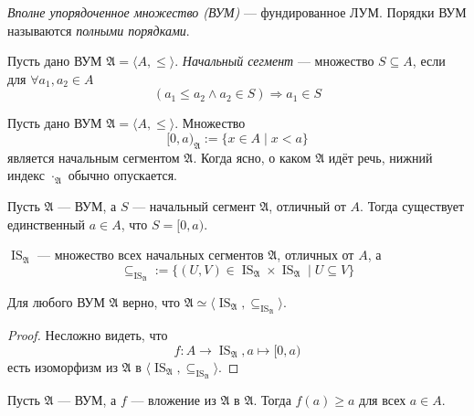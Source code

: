 \documentclass[12pt,a4paper]{article}
\DeclareMathOperator{\IS}{IS}
\begin{document}
    \begin{definition}
        \emph{Вполне упорядоченное множество (ВУМ)} --- фундированное ЛУМ. Порядки ВУМ называются \emph{полными порядками}.
    \end{definition}

    \begin{definition}
        Пусть дано ВУМ $\mathfrak{A} = \langle A, {\leqslant} \rangle$. \emph{Начальный сегмент} --- множество $S \subseteq A$, если для $\forall a_1, a_2 \in A$
        \[(a_1 \leqslant a_2 \wedge a_2 \in S) \Rightarrow a_1 \in S\]
    \end{definition}

    \begin{definition}
        Пусть дано ВУМ $\mathfrak{A} = \langle A, {\leqslant} \rangle$. Множество
        \[[0, a)_{\mathfrak{A}} := \{x \in A \mid x < a\}\]
        является начальным сегментом $\mathfrak{A}$. Когда ясно, о каком $\mathfrak{A}$ идёт речь, нижний индекс $\cdot_{\mathfrak{A}}$ обычно опускается.
    \end{definition}

    \begin{statement}
        Пусть $\mathfrak{A}$ --- ВУМ, а $S$ --- начальный сегмент $\mathfrak{A}$, отличный от $A$. Тогда существует единственный $a \in A$, что $S = [0, a)$.
    \end{statement}

    \begin{definition}
        $\IS_\mathfrak{A}$ --- множество всех начальных сегментов $\mathfrak{A}$, отличных от $A$, а
        \[{\subseteq}_{\IS_\mathfrak{A}} := \{(U, V) \in \IS_\mathfrak{A} \times \IS_\mathfrak{A} \mid U \subseteq V\}\]
    \end{definition}

    \begin{statement}
        Для любого ВУМ $\mathfrak{A}$ верно, что $\mathfrak{A} \simeq \langle \IS_\mathfrak{A}, {\subseteq}_{\IS_\mathfrak{A}} \rangle$.
    \end{statement}

    \begin{proof}
        Несложно видеть, что
        \[f: A \to \IS_\mathfrak{A}, a \mapsto [0, a)\]
        есть изоморфизм из $\mathfrak{A}$ в $\langle \IS_\mathfrak{A}, {\subseteq}_{\IS_\mathfrak{A}} \rangle$.
    \end{proof}

    \begin{statement}
        Пусть $\mathfrak{A}$ --- ВУМ, а $f$ --- вложение из $\mathfrak{A}$ в $\mathfrak{A}$. Тогда $f(a) \geqslant a$ для всех $a \in A$.
    \end{statement}
\end{document}
